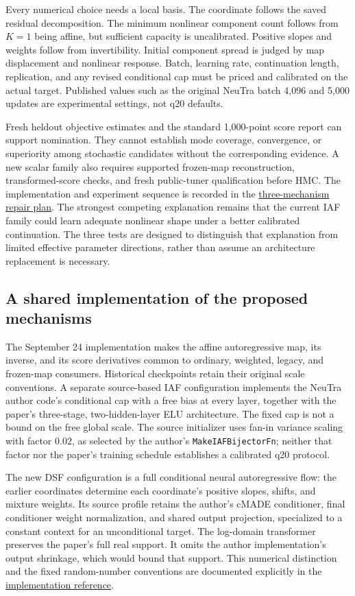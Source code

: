 Every numerical choice needs a local basis. The coordinate follows the saved
residual decomposition. The minimum nonlinear component count follows from
$K=1$ being affine, but sufficient capacity is uncalibrated. Positive slopes
and weights follow from invertibility. Initial component spread is judged by
map displacement and nonlinear response. Batch, learning rate, continuation
length, replication, and any revised conditional cap must be priced and
calibrated on the actual target. Published values such as the original NeuTra
batch 4,096 and 5,000 updates are experimental settings, not q20 defaults.

Fresh heldout objective estimates and the standard 1,000-point score report
can support nomination. They cannot establish mode coverage, convergence, or
superiority among stochastic candidates without the corresponding evidence.
A new scalar family also requires supported frozen-map reconstruction,
transformed-score checks, and fresh public-tuner qualification before HMC.
The implementation and experiment sequence is recorded in the
\href{../plans/bayesfilter-q20-three-mechanisms-plan-2026-09-23.md}{three-mechanism repair plan}.
The strongest competing explanation remains that the current IAF family could
learn adequate nonlinear shape under a better calibrated continuation. The
three tests are designed to distinguish that explanation from limited effective
parameter directions, rather than assume an architecture replacement is necessary.

\subsection{A shared implementation of the proposed mechanisms}

The September 24 implementation makes the affine autoregressive map, its
inverse, and its score derivatives common to ordinary, weighted, legacy,
and frozen-map consumers. Historical checkpoints retain their original scale
conventions. A separate source-based IAF configuration implements the NeuTra
author code's conditional cap with a free bias at every layer, together with
the paper's three-stage, two-hidden-layer ELU architecture. The fixed cap is
not a bound on the free global scale. The source initializer uses fan-in
variance scaling with factor $0.02$, as selected by the author's
\texttt{MakeIAFBijectorFn}; neither that factor nor the paper's training
schedule establishes a calibrated q20 protocol.

The new DSF configuration is a full conditional neural autoregressive flow:
the earlier coordinates determine each coordinate's positive slopes, shifts,
and mixture weights. Its source profile retains the author's cMADE
conditioner, final conditioner weight normalization, and shared output
projection, specialized to a constant context for an unconditional target.
The log-domain transformer preserves the paper's full real support. It omits
the author implementation's output shrinkage, which would bound that support.
This numerical distinction and the fixed random-number conventions are
documented explicitly in the
\href{../reference/neutra-implementation.md}{implementation reference}.

